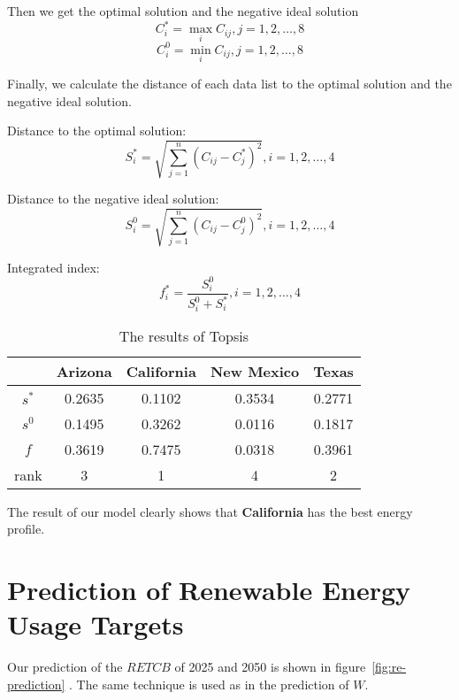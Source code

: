 \documentclass{mcmthesis}
\begin{document}
Then we get the optimal solution and the negative ideal solution
\begin{equation}
C_i^{*} = \max_{i} C_{ij}, j = 1, 2, \dots, 8
\end{equation}
\begin{equation}
C_i^{0} = \min_{i} C_{ij}, j = 1, 2, \dots, 8
\end{equation}

Finally, we calculate the distance of each data list to the optimal solution and the negative ideal solution.

Distance to the optimal solution:
\begin{equation}
S_i^{*} = \sqrt{\sum_{j=1}^n(C_{ij} - C_{j}^{*})^2}, i = 1, 2, \dots, 4
\end{equation}

Distance to the negative ideal solution:
\begin{equation}
S_i^{0} = \sqrt{\sum_{j=1}^n(C_{ij} - C_{j}^{0})^2}, i = 1, 2, \dots, 4
\end{equation}

Integrated index:
\begin{equation}
f_i^{*} = \frac{S_i^{0}}{S_i^{0} + S_i^{*}}, i = 1, 2, \dots, 4
\end{equation}

\begin{table}[h]
\center
\begin{tabular}{c|cccc}
& Arizona & California & New Mexico & Texas \\ \hline
$s^{*}$ & 0.2635 & 0.1102 & 0.3534 & 0.2771 \\
$s^{0}$ & 0.1495 & 0.3262 & 0.0116 & 0.1817 \\
$f$ & 0.3619 & 0.7475 & 0.0318 & 0.3961 \\
rank & 3 & 1 & 4 & 2
\end{tabular}
\caption{The results of Topsis}
\label{table:name_3}
\end{table}

The result of our model clearly shows that \textbf{California} has the best energy profile.


\section{Prediction of Renewable Energy Usage Targets}

Our prediction of the $RETCB$ of 2025 and 2050 is shown in figure~\ref{fig:re-prediction} . The same technique is used as in the prediction of $W$.
\end{document}
